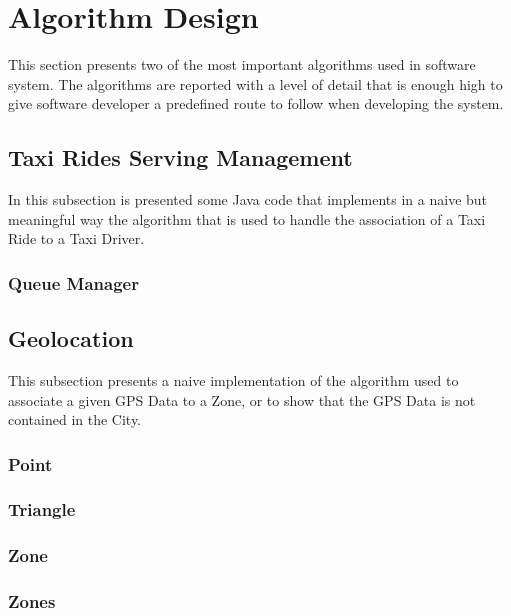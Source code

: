 \section{Algorithm Design}

This section presents two of the most important algorithms used in \myTaxiService{} software system.
The algorithms are reported with a level of detail that is enough high to give software developer a predefined route to follow when developing the system.
\configureJava{}
\subsection{Taxi Rides Serving Management}
In this subsection is presented some Java code that implements in a naive but meaningful way the algorithm that is used to handle the association of a Taxi Ride to a Taxi Driver.
\subsubsection{Queue Manager}

\subsection{Geolocation}
This subsection presents a naive implementation of the algorithm used to associate a given GPS Data to a Zone, or to show that the GPS Data is not contained in the City.
\subsubsection{Point}
\subsubsection{Triangle}
\subsubsection{Zone}
\subsubsection{Zones}
